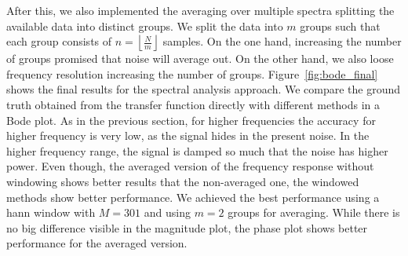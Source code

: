 \documentclass{scrartcl}
\begin{document}
After this, we also implemented the averaging over multiple spectra splitting the available data into distinct groups.
We split the data into $m$ groups such that each group consists of $n = \left\lfloor\frac{N}{m}\right\rfloor$ samples.
On the one hand, increasing the number of groups promised that noise will average out.
On the other hand, we also loose frequency resolution increasing the number of groups.
Figure~\ref{fig:bode_final} shows the final results for the spectral analysis approach.
We compare the ground truth obtained from the transfer function directly with different methods in a Bode plot.
As in the previous section, for higher frequencies the accuracy for higher frequency is very low, as the signal hides in the present noise.
In the higher frequency range, the signal is damped so much that the noise has higher power.
Even though, the averaged version of the frequency response without windowing shows better results that the non-averaged one, the windowed methods show better performance.
We achieved the best performance using a hann window with $M=301$ and using $m=2$ groups for averaging.
While there is no big difference visible in the magnitude plot, the phase plot shows better performance for the averaged version.
\end{document}
